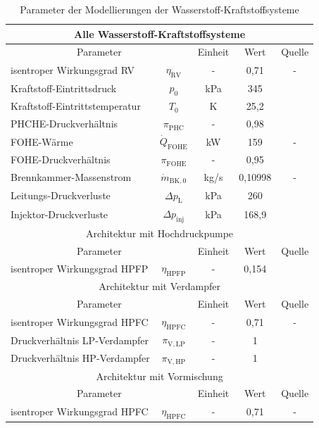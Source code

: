 \begin{table}[ht]
    \centering
	\caption{Parameter der Modellierungen der Wasserstoff-Kraftstoffsysteme}
	\begin{tabular} {|l|c|c|c|c|} \hline%
    \multicolumn{5}{|c}{Alle Wasserstoff-Kraftstoffsysteme}\\ \hline
    \multicolumn{2}{|c|}{Parameter} & Einheit & Wert & Quelle\\ \hline\hline%
    isentroper Wirkungsgrad RV & $\eta_\mathrm{RV}$ & - & 0,71 & - \\ \hline
    Kraftstoff-Eintrittsdruck & $p_0$ & kPa & 345 & \cite{Brewer.1991, Scholz.2003} \\ \hline
    Kraftstoff-Eintrittstemperatur & $T_0$ & K & 25,2 & \cite{Brewer.1991, Scholz.2003} \\ \hline
    PHCHE-Druckverhältnis  & $\pi_\mathrm{PHC}$ & - & 0,98 & \cite{Sciatti.2025} \\ \hline
    FOHE-Wärme & $\dot{Q}_\mathrm{FOHE}$ & kW & 159 & - \\ \hline
    FOHE-Druckverhältnis & $\pi_\mathrm{FOHE}$ & - & 0,95 & \cite{Brewer.1991} \\ \hline
    Brennkammer-Massenstrom & $\dot{m}_{\mathrm{BK},0}$ & kg/s & 0,10998 & - \\ \hline
    Leitungs-Druckverluste & $\Delta p_\mathrm{L}$ & kPa & 260 & \cite{Brewer.1991} \\ \hline
    Injektor-Druckverluste & $\Delta p_\mathrm{inj}$ & kPa & 168,9 & \cite{Brewer.1991} \\ \hline\hline
	\multicolumn{5}{|c|}{Architektur mit Hochdruckpumpe}\\ \hline
    \multicolumn{2}{|c|}{Parameter} & Einheit & Wert & Quelle\\ \hline\hline%
    isentroper Wirkungsgrad HPFP & $\eta_\mathrm{HPFP}$ & - & 0,154 & \cite{Brewer.1991} \\ \hline
    \multicolumn{5}{|c|}{Architektur mit Verdampfer}\\ \hline
    \multicolumn{2}{|c|}{Parameter} & Einheit & Wert & Quelle\\ \hline\hline%
    isentroper Wirkungsgrad HPFC & $\eta_\mathrm{HPFC}$ & - & 0,71 & - \\ \hline
    Druckverhältnis LP-Verdampfer & $\pi_\mathrm{V,LP}$ & - & 1 & \cite{Sciatti.2025} \\ \hline
    Druckverhältnis HP-Verdampfer & $\pi_\mathrm{V,HP}$ & - & 1 & \cite{Sciatti.2025} \\ \hline\hline
    \multicolumn{5}{|c|}{Architektur mit Vormischung}\\ \hline
    \multicolumn{2}{|c|}{Parameter} & Einheit & Wert & Quelle\\ \hline\hline%
    isentroper Wirkungsgrad HPFC & $\eta_\mathrm{HPFC}$ & - & 0,71 & - \\ \hline
    \end{tabular}	
    \label{Tab:h2_parametrisiert}%
\end{table}
\FloatBarrier 

